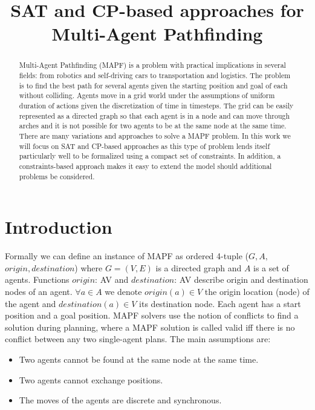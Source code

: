 \documentclass[12pt, a4paper, hidelinks]{article}
\begin{document}
\title{SAT and CP-based approaches for Multi-Agent Pathfinding}
\maketitle
\begin{abstract}
Multi-Agent Pathfinding (MAPF) is a problem with practical implications in several fields: from robotics and self-driving cars to transportation and logistics. The problem is to find the best path for several agents given the starting position and goal of each without colliding. Agents move in a grid world under the assumptions of uniform duration of actions given the discretization of time in timesteps. The grid can be easily represented as a directed graph so that each agent is in a node and can move through arches and it is not possible for two agents to be at the same node at the same time. There are many variations and approaches to solve a MAPF problem. In this work we will focus on SAT and CP-based approaches as this type of problem lends itself particularly well to be formalized using a compact set of constraints. In addition, a constraints-based approach makes it easy to extend the model should additional problems be considered.
\end{abstract}

\section{Introduction}
Formally we can define an instance of MAPF as ordered 4-tuple ($G, A,$ $origin, destination$) where $G = (V, E)$ is a directed graph and $A$ is a set of agents. Functions $origin$: A\textrightarrow V and $destination$: A\textrightarrow V describe origin and destination nodes of an agent. $\forall a\in A$ we denote $origin(a)\in V$ the origin location (node) of the agent and $destination(a)\in V$ its destination node. Each agent has a start position and a goal position. MAPF solvers use the notion of conflicts to find a solution during planning, where a MAPF solution is called valid iff there is no conflict between any two single-agent plans. The main assumptions are:

\begin{itemize} 
\item Two agents cannot be found at the same node at the same time.
\item Two agents cannot exchange positions.
\item The moves of the agents are discrete and synchronous.
\end{itemize}
\end{document}
